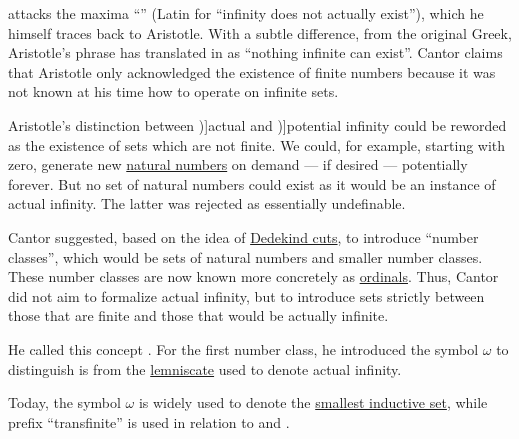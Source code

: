 \begin{concept}\label{con:transfinitum}
  \textcite[73]{Кантор1985Многообразия} attacks the maxima \enquote{} (Latin for \enquote{infinity does not actually exist}), which he himself traces back to Aristotle. With a subtle difference, from the original Greek, Aristotle's phrase has translated in \cite[3385]{Aristotle1984CompleteWorks:Metaphysics} as \enquote{nothing infinite can exist}. Cantor claims that Aristotle only acknowledged the existence of finite numbers because it was not known at his time how to operate on infinite sets.

  Aristotle's distinction between \term[en=actual infinity (\cite[196]{Kleene2002Logic})]{actual} and \term[ru=потенциальная бесконечность, en=potential infinite (\cite[196]{Kleene2002Logic})]{potential infinity} could be reworded as the existence of sets which are not finite. We could, for example, starting with zero, generate new \hyperref[def:natural_numbers]{natural numbers} on demand --- if desired --- potentially forever. But no set of natural numbers could exist as it would be an instance of actual infinity. The latter was rejected as essentially undefinable.

  Cantor suggested, based on the idea of \hyperref[def:dedekind_cut]{Dedekind cuts}, to introduce \enquote{number classes}, which would be sets of natural numbers and smaller number classes. These number classes are now known more concretely as \hyperref[def:ordinal]{ordinals}. Thus, Cantor did not aim to formalize actual infinity, but to introduce sets strictly between those that are finite and those that would be actually infinite.

  He called this concept . For the first number class, he introduced the symbol \( \omega \) to distinguish is from the \hyperref[rem:lemniscate_symbol]{lemniscate} used to denote actual infinity.

  Today, the symbol \( \omega \) is widely used to denote the \hyperref[def:smallest_inductive_set]{smallest inductive set}, while prefix \enquote{transfinite} is used in relation to  and .
\end{concept}

